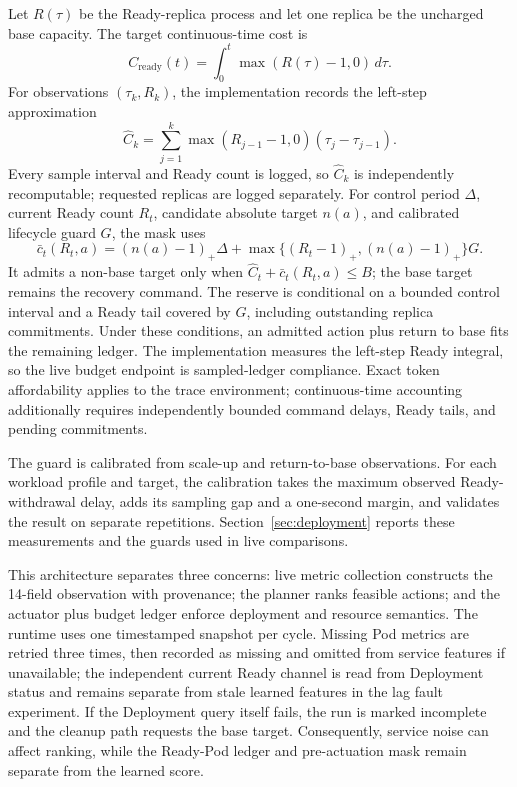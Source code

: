 \documentclass[acmsmall,screen,review,anonymous]{acmart}
\begin{document}
Let \(R(\tau)\) be the Ready-replica process and let one replica be the
uncharged base capacity.  The target continuous-time cost is
\begin{equation}
 C_{\mathrm{ready}}(t)=
 \int_0^t \max(R(\tau)-1,0)\,d\tau.
\end{equation}
For observations \((\tau_k,R_k)\), the implementation records the left-step
approximation
\begin{equation}
 \widehat C_k=\sum_{j=1}^{k}
 \max(R_{j-1}-1,0)(\tau_j-\tau_{j-1}).
\end{equation}
Every sample interval and Ready count is logged, so \(\widehat C_k\) is
independently recomputable; requested replicas are logged separately.  For
control period \(\Delta\), current Ready count \(R_t\), candidate absolute
target \(n(a)\), and calibrated lifecycle guard \(G\), the mask uses
\begin{equation}
 \bar c_t(R_t,a)=(n(a)-1)_+\Delta+
 \max\{(R_t-1)_+,(n(a)-1)_+\}G.
\end{equation}
It admits a non-base target only when
\(\widehat C_t+\bar c_t(R_t,a)\le B\); the base target remains the recovery
command. The reserve is conditional on a bounded control interval and a Ready
tail covered by \(G\), including outstanding replica commitments. Under these
conditions, an admitted action plus return to base fits the remaining ledger.
The implementation measures the left-step Ready integral, so the live budget
endpoint is sampled-ledger compliance. Exact token affordability applies to
the trace environment; continuous-time accounting additionally requires
independently bounded command delays, Ready tails, and pending commitments.

The guard is calibrated from scale-up and return-to-base observations.
For each workload profile and target, the calibration takes the maximum
observed Ready-withdrawal delay, adds its sampling gap and a one-second margin,
and validates the result on separate repetitions. Section~\ref{sec:deployment}
reports these measurements and the guards used in live comparisons.

This architecture separates three concerns: live metric collection constructs
the 14-field observation with provenance; the planner ranks feasible actions;
and the actuator plus budget ledger enforce deployment and resource semantics.
The runtime uses one timestamped snapshot per cycle.  Missing Pod metrics are
retried three times, then recorded as missing and omitted from service
features if unavailable; the independent current Ready
channel is read from Deployment status and remains separate from stale learned
features in the lag fault experiment.  If the Deployment query itself fails,
the run is marked incomplete and the cleanup path requests the base target.
Consequently, service noise can affect ranking, while the Ready-Pod ledger and
pre-actuation mask remain separate from the learned score.
\end{document}

